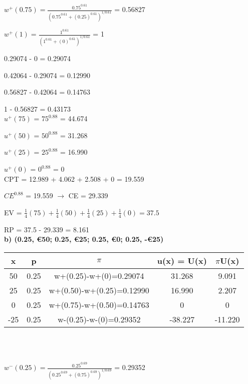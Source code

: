 \documentclass{article}
\begin{document}
$w^+(0.75) = \frac{0.75^{0.61}}{(0.75^{0.61}+(0.25)^{0.61})^{1/0.61}}$ = 0.56827

$w^+(1) = \frac{1^{0.61}}{(1^{0.61}+(0)^{0.61})^{1/0.61}}$ = 1 \\ 

\normalsize

0.29074 - 0 = 0.29074

0.42064 - 0.29074 = 0.12990

0.56827 - 0.42064 = 0.14763

1 - 0.56827 = 0.43173 \\

$u^+(75)$ = $75^{0.88}$ = 44.674

$u^+(50)$ = $50^{0.88}$ = 31.268

$u^+(25)$ = $25^{0.88}$ = 16.990

$u^+(0)$ = $0^{0.88}$ = 0 \\

CPT = 12.989 + 4.062 + 2.508 + 0 = 19.559

$CE^{0.88}$ = 19.559 $\rightarrow$ CE = 29.339

\vspace{1.5mm}

EV = $\frac{1}{4}(75)+\frac{1}{4}(50)+\frac{1}{4}(25)+\frac{1}{4}(0)=37.5$

RP = 37.5 - 29.339 = 8.161 \\ 

\textbf{ b) (0.25, €50; 0.25, €25; 0.25, €0; 0.25, -€25)} 

 \vspace{2mm}
 
 \begin{tabular}{|c|c|c|c|c|}
 	\hline
 	x  & p    & $\pi$                         & u(x) = U(x) & $\pi$U(x)  \\ \hline
 	50 & 0.25 & w+(0.25)-w+(0)=0.29074    & 31.268      & 9.091 \\ \hline
 	25 & 0.25 & w+(0.50)-w+(0.25)=0.12990 & 16.990     & 2.207  \\ \hline
 	0 & 0.25 & w+(0.75)-w+(0.50)=0.14763 & 0      & 0  \\ \hline
 	-25  & 0.25 & w-(0.25)-w-(0)=0.29352    & -38.227           & -11.220      \\ \hline
 \end{tabular} \\ \\ 

\Large 

$w^-(0.25) = \frac{0.25^{0.69}}{(0.25^{0.69}+(0.75)^{0.69})^{1/0.69}}$ = 0.29352
\end{document}
